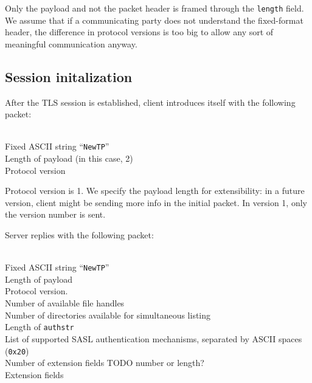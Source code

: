 Only the payload and not the packet header is framed through the {\tt length} field. We assume that if
a communicating party does not understand the fixed-format header, the difference in protocol versions is too
big to allow any sort of meaningful communication anyway.

%

\subsection{Session initalization}

\begin{samepage}
After the TLS session is established, client introduces itself with the following packet:
\begin{description}[parsep=1pt]
	 \hfill \\
		Fixed ASCII string ``{\tt NewTP}''
	 \hfill \\
		Length of payload (in this case, 2)
	 \hfill \\
		Protocol version
\end{description}

Protocol version is 1. We specify the payload length for extensibility: in a future version, client might be
sending more info in the initial packet. In version 1, only the version number is sent.
\end{samepage}

\begin{samepage}
Server replies with the following packet:
\begin{description}[parsep=1pt]
	 \hfill \\
		Fixed ASCII string ``{\tt NewTP}''
	 \hfill \\
		Length of payload
	 \hfill \\
		Protocol version.
	 \hfill \\
		Number of available file handles
	 \hfill \\
		Number of directories available for simultaneous listing
	 \hfill \\
		Length of {\tt authstr}
	 \hfill \\
		List of supported SASL authentication mechanisms, separated by ASCII spaces ({\tt 0x20})
	 \hfill \\
		Number of extension fields TODO number or length?
	 \hfill \\
		Extension fields
\end{description}
\end{samepage}


